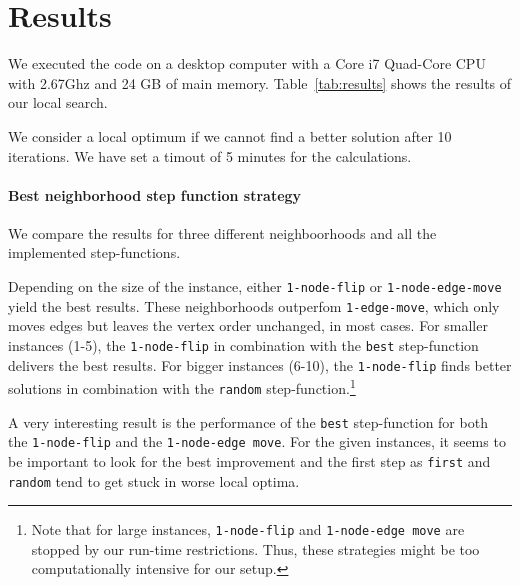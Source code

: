 \documentclass{scrartcl}
\begin{document}


\section{Results}

We executed the code on a desktop computer with a Core i7 Quad-Core
CPU with 2.67Ghz and 24 GB of main memory. Table~\ref{tab:results}
shows the results of our local search. 

We consider a local optimum if we cannot find a better solution after 10 iterations.
We have set a timout of 5 minutes for the calculations.

\paragraph{Best neighborhood step function strategy}

We compare the results for three different neighboorhoods and all the
implemented step-functions.

Depending on the size of the instance, either \texttt{1-node-flip} or
\texttt{1-node-edge-move} yield the best results. These neighborhoods
outperfom \texttt{1-edge-move}, which only moves edges but leaves the
vertex order unchanged, in most cases. For smaller instances (1-5), the
\texttt{1-node-flip} in combination with the \texttt{best} step-function delivers
the best results.  For bigger instances (6-10), the
\texttt{1-node-flip} finds better solutions in combination with the
\texttt{random} step-function.\footnote{Note that for large instances,
  \texttt{1-node-flip} and \texttt{1-node-edge move} are stopped by
  our run-time restrictions. Thus, these strategies might be too
  computationally intensive for our setup.}

A very interesting result is the performance of the \texttt{best}
step-function for both the \texttt{1-node-flip} and the
\texttt{1-node-edge move}. For the given instances, it seems to be
important to look for the best improvement and the first step as
\texttt{first} and \texttt{random} tend to get stuck in worse local
optima.

\end{document}
